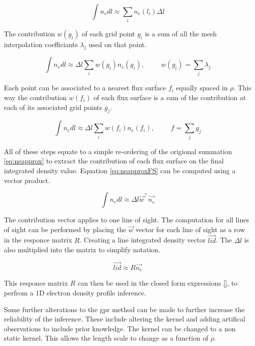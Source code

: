 \begin{equation}
  \int n_e dl \approx \sum_i n_e(l_i) \Delta l
  \label{eq:neapprox}
\end{equation}

The contribution $w(g_i)$ of each grid point $g_i$ is a sum of all the mesh interpolation coefficiants $\lambda_j$ used on that point.

\begin{equation}
  \int n_e dl \approx \Delta l \sum_i w(g_i) n_e(g_i), \hspace{1cm} w(g_i) = \sum_j \lambda_j  
\end{equation}

Each point can be associated to a nearest flux surface $f_i$ equally spaced in $\rho$. This way the contribution $w(f_i)$ of each flux surface is a sum of the contribution at each of its associated grid points $g_j$.

\begin{equation}
  \int n_e dl \approx \Delta l \sum_i w(f_i) n_e(f_i), \hspace{1cm} f = \sum_j g_j
  \label{eq:neapproxFS}
\end{equation}

All of these steps equate to a simple re-ordering of the origional summation \ref{eq:neapprox} to extract the contribution of each flux surface on the final integrated density value. Equation \ref{eq:neapproxFS} can be computed using a vector product.

\begin{equation}
  \int n_e dl \approx \Delta l \vec{w}^{\top} \vec{n_e}
\end{equation}

The contribution vector applies to one line of sight. The computation for all lines of sight can be performed by placing the $\vec{w}$ vector for each line of sight as a row in the responce matrix $R$. Creating a line integrated density vector $\vec{lid}$. The $\Delta l$ is also multiplied into the matrix to simplify notation.

\begin{equation}
  \vec{lid} \approx R \vec{n_e}
\end{equation}

This responce matrix $R$ can then be used in the closed form expressions \ref{}, to perfrom a 1D electron density profile inference.

Some further alterations to the \gls{gpr} method can be made to further increase the reliability of the inference. These include altering the kernel and adding artifical observations to include prior knowledge. The kernel can be changed to a non static kernel. This allows the length scale to change as a function of $\rho$. 

